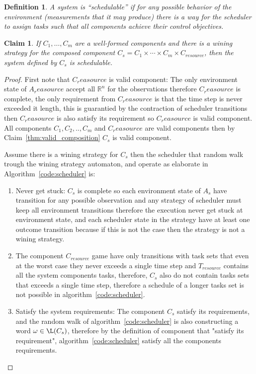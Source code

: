 \documentclass[ twoside, 12pt ]{article}
\newcommand\R{{\mathbb R}}
\newtheorem{dfn}{Definition} %
\newtheorem{claim}[thm]{Claim}
\begin{document}
\begin{dfn}
	A system is ``schedulable'' if for any possible behavior of the environment (measurements that it may produce) there is a way for the scheduler to assign tasks such that all components achieve their control objectives.
\end{dfn}

\begin{claim}
    If $C_1,\dots , C_m$ are a well-formed components and there is a wining strategy for the composed component $C_s=C_1 \times \cdots \times C_m \times C_ {resource}$, then the system defined by $C_s$ is schedulable.
\end{claim}
\begin{proof}
    First note that $C_reasource$ is valid component:
    The only environment state of $A_reasource$ accept all $\R^n$ for the observations therefore $C_reasource$ is complete, the only requirement from $C_reasource$ is that the time step is never exceeded it length, this is guarantied by the contraction of scheduler transitions then $C_reasource$ is also satisfy its requirement so $C_reasource$ is valid component.
    All components $C_1 , C_2 , .. , C_m$ and $C_reasource $ are valid components then by Claim~\ref{thm:valid_composition} $C_s $ is valid component.
    
    Assume there is a wining strategy for $C_s$ then the scheduler that random walk trough the wining strategy automaton, and operate as elaborate in Algorithm~\ref{code:scheduler} is:
    \begin{enumerate}
        \item Never get stuck: $C_s$ is complete so each environment state of $A_s$ have transition for any possible observation and any strategy of scheduler must keep all environment transitions therefore the execution never get stuck at environment state, and each scheduler state in the strategy have at least one outcome transition because if this is not the case then the strategy is not a wining strategy. 
        
        \item The component $C_{resource}$ game have only transitions with task sets that even at the worst case they never exceeds a single time step and $T_{resource}$ contains all the system components tasks, therefore, $C_s$ also do not contain tasks sets that exceeds a single time step, therefore a schedule of a longer tasks set is not possible in algorithm~\ref{code:scheduler}.
        
        \item Satisfy the system requirements: The component $C_s$ satisfy its requirements, and the random walk of algorithm~\ref{code:scheduler} is also constructing a word $\omega \in \L(C_s)$, therefore by the definition of component that "satisfy its requirement", algorithm~\ref{code:scheduler} satisfy all the components requirements.
    \end{enumerate}
\end{proof}
\end{document}
